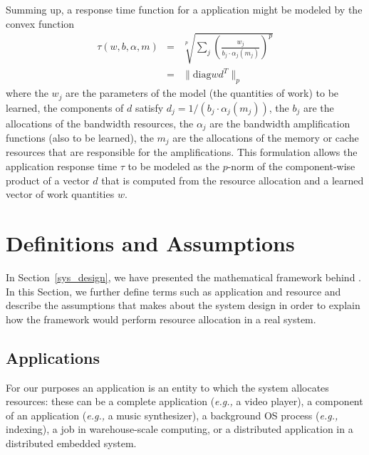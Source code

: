 Summing up, a response time function for a application might be modeled by the convex function
\begin{eqnarray*}
\tau(w,b,\alpha,m) &=& \sqrt[p]{\sum_j \left(\frac{w_j}{b_j\cdot\alpha_j(m_j)}\right)^p}  \\
                   &=& \|\mbox{diag} wd^T \|_p
\end{eqnarray*}
where the $w_j$ are the parameters of the model (the quantities of work) to be learned,
the components of $d$ satisfy $d_j = 1/(b_j\cdot\alpha_j(m_j))$,
the $b_j$  are the allocations of the bandwidth resources,
the $\alpha_j$ are the bandwidth amplification functions (also to be learned),
the $m_j$ are the allocations of the memory or cache resources that are responsible for the amplifications.
This formulation allows the application response time $\tau$ to be modeled as the $p$-norm of
the component-wise product of a vector $d$ that is computed from the resource allocation
and a learned vector of work quantities $w$.


\section{Definitions and Assumptions}
In Section~\ref{sys_design}, we have presented the mathematical framework behind \pacora.  In this Section, we further define terms such as application and resource and describe the assumptions that \pacora makes about the system design in order to explain how the framework would perform resource allocation in a real system.


\subsection{Applications}

For our purposes an application is an entity to which the system
allocates resources: these can be a complete application (\emph{e.g.,}
a video player), a component of an application (\emph{e.g.,} a music
synthesizer), a background OS process (\emph{e.g.,} indexing), a job
in warehouse-scale computing, or a distributed application in a
distributed embedded system.

